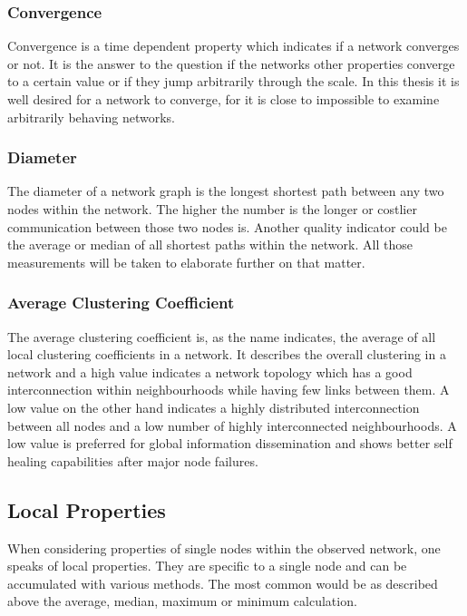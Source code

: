 \subsubsection{Convergence}
Convergence is a time dependent property which indicates if a network converges
or not. It is the answer to the question if the networks other properties
converge to a certain value or if they jump arbitrarily through the scale.
In this thesis it is well desired for a network to converge, for it is close to
impossible to examine arbitrarily behaving networks.

\subsubsection{Diameter}
The diameter of a network graph is the longest shortest path between any two
nodes within the network. The higher the number is the longer or costlier
communication between those two nodes is. Another quality indicator could be the
average or median of all shortest paths within the network. All those
measurements will be taken to elaborate further on that matter.

\subsubsection{Average Clustering Coefficient}
The average clustering coefficient is, as the name indicates,  the average of
all local clustering coefficients in a network. It describes the overall
clustering in a network and a high value indicates a network topology which has
a good interconnection within neighbourhoods while having few links between them.
A low value on the other hand indicates a highly distributed interconnection
between all nodes and a low number of highly interconnected neighbourhoods. A low
value is preferred for global information dissemination and shows better self
healing capabilities after major node failures.
\subsection{Local Properties}
When considering properties of single nodes within the observed network, one
speaks of local properties. They are specific to a single node and can be
accumulated with various methods. The most common would be as described above
the average, median, maximum or minimum calculation. 
